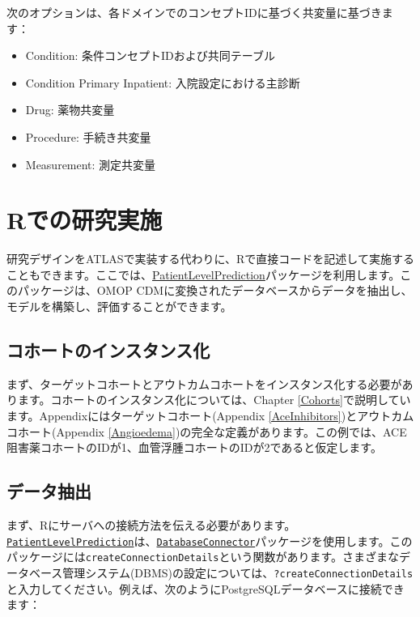 \documentclass[
  11pt]{book}
\providecommand{\tightlist}{%
  \setlength{\itemsep}{0pt}\setlength{\parskip}{0pt}}
\theoremstyle{definition}
\theoremstyle{definition}
\theoremstyle{definition}
\theoremstyle{definition}
\theoremstyle{remark}
\begin{document}
次のオプションは、各ドメインでのコンセプトIDに基づく共変量に基づきます：

\begin{itemize}
\tightlist
\item
  Condition: 条件コンセプトIDおよび共同テーブル
\item
  Condition Primary Inpatient: 入院設定における主診断
\item
  Drug: 薬物共変量
\item
  Procedure: 手続き共変量
\item
  Measurement: 測定共変量
\end{itemize}

\section{Rでの研究実施}\label{rux3067ux306eux7814ux7a76ux5b9fux65bd}

研究デザインをATLASで実装する代わりに、Rで直接コードを記述して実施することもできます。ここでは、\href{https://ohdsi.github.io/PatientLevelPrediction/}{PatientLevelPrediction}パッケージを利用します。このパッケージは、OMOP CDMに変換されたデータベースからデータを抽出し、モデルを構築し、評価することができます。

\subsection{コホートのインスタンス化}\label{ux30b3ux30dbux30fcux30c8ux306eux30a4ux30f3ux30b9ux30bfux30f3ux30b9ux5316-1}

まず、ターゲットコホートとアウトカムコホートをインスタンス化する必要があります。コホートのインスタンス化については、Chapter \ref{Cohorts}で説明しています。Appendixにはターゲットコホート(Appendix \ref{AceInhibitors})とアウトカムコホート(Appendix \ref{Angioedema})の完全な定義があります。この例では、ACE阻害薬コホートのIDが1、血管浮腫コホートのIDが2であると仮定します。

\subsection{データ抽出}\label{ux30c7ux30fcux30bfux62bdux51fa-3}

まず、Rにサーバへの接続方法を伝える必要があります。\href{https://ohdsi.github.io/PatientLevelPrediction/}{\texttt{PatientLevelPrediction}}は、\href{https://ohdsi.github.io/DatabaseConnector/}{\texttt{DatabaseConnector}}パッケージを使用します。このパッケージには\texttt{createConnectionDetails}という関数があります。さまざまなデータベース管理システム(DBMS)の設定については、\texttt{?createConnectionDetails}と入力してください。例えば、次のようにPostgreSQLデータベースに接続できます：
\end{document}
